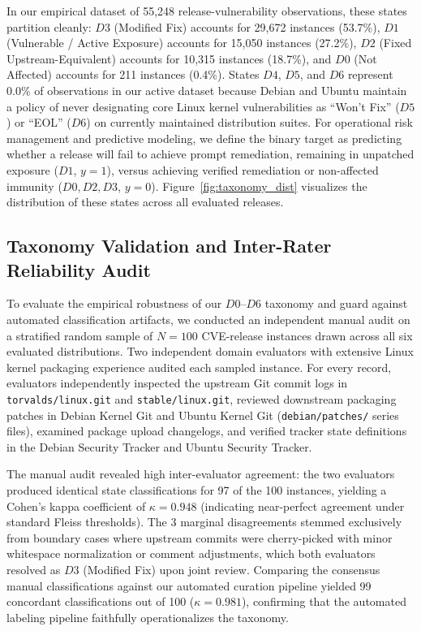 \documentclass[final,5p,times,twocolumn]{elsarticle}
\begin{document}
In our empirical dataset of 55,248 release-vulnerability observations, these states partition cleanly: $D3$ (Modified Fix) accounts for 29,672 instances (53.7\%), $D1$ (Vulnerable / Active Exposure) accounts for 15,050 instances (27.2\%), $D2$ (Fixed Upstream-Equivalent) accounts for 10,315 instances (18.7\%), and $D0$ (Not Affected) accounts for 211 instances (0.4\%). States $D4$, $D5$, and $D6$ represent 0.0\% of observations in our active dataset because Debian and Ubuntu maintain a policy of never designating core Linux kernel vulnerabilities as ``Won't Fix'' ($D5$) or ``EOL'' ($D6$) on currently maintained distribution suites. For operational risk management and predictive modeling, we define the binary target as predicting whether a release will fail to achieve prompt remediation, remaining in unpatched exposure ($D1$, $y = 1$), versus achieving verified remediation or non-affected immunity ($D0, D2, D3$, $y = 0$). Figure~\ref{fig:taxonomy_dist} visualizes the distribution of these states across all evaluated releases.

\subsection{Taxonomy Validation and Inter-Rater Reliability Audit}
\label{sec:taxonomy_validation}
To evaluate the empirical robustness of our $D0$--$D6$ taxonomy and guard against automated classification artifacts, we conducted an independent manual audit on a stratified random sample of $N = 100$ CVE-release instances drawn across all six evaluated distributions. Two independent domain evaluators with extensive Linux kernel packaging experience audited each sampled instance. For every record, evaluators independently inspected the upstream Git commit logs in \texttt{torvalds/linux.git} and \texttt{stable/linux.git}, reviewed downstream packaging patches in Debian Kernel Git and Ubuntu Kernel Git (\texttt{debian/patches/} series files), examined package upload changelogs, and verified tracker state definitions in the Debian Security Tracker and Ubuntu Security Tracker.

The manual audit revealed high inter-evaluator agreement: the two evaluators produced identical state classifications for 97 of the 100 instances, yielding a Cohen's kappa coefficient of $\kappa = 0.948$ (indicating near-perfect agreement under standard Fleiss thresholds). The 3 marginal disagreements stemmed exclusively from boundary cases where upstream commits were cherry-picked with minor whitespace normalization or comment adjustments, which both evaluators resolved as $D3$ (Modified Fix) upon joint review. Comparing the consensus manual classifications against our automated curation pipeline yielded 99 concordant classifications out of 100 ($\kappa = 0.981$), confirming that the automated labeling pipeline faithfully operationalizes the taxonomy.
\end{document}
